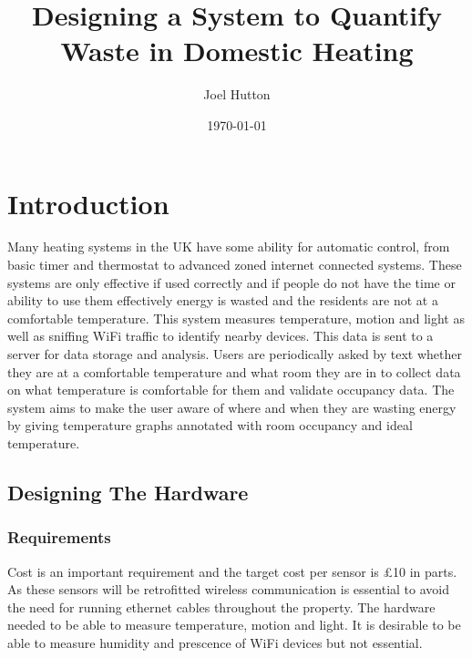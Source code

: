 \documentclass[bsc,frontabs,twoside,singlespacing,parskip,deptreport]{infthesis}
\begin{document}
\title{Designing a System to Quantify Waste in Domestic Heating}

\author{Joel Hutton}


\date{\today}


\maketitle

\tableofcontents



\chapter{Introduction}

Many heating systems in the UK have some ability for automatic control, from basic timer and thermostat to advanced zoned internet connected systems. These systems are only effective if used correctly and if people do not have the time or ability to use them effectively energy is wasted and the residents are not at a comfortable temperature. This system measures temperature, motion and light as well as sniffing WiFi traffic to identify nearby devices. This data is sent to a server for data storage and analysis. Users are periodically asked by text whether they are at a comfortable temperature and what room they are in to collect data on what temperature is comfortable for them and validate occupancy data. The system aims to make the user aware of where and when they are wasting energy by giving temperature graphs annotated with room occupancy and ideal temperature.        

\section{Designing The Hardware}
\subsection{Requirements}
Cost is an important requirement and the target cost per sensor is £10 in parts. As these sensors will be retrofitted wireless communication is essential to avoid the need for running ethernet cables throughout the property. The hardware needed to be able to measure temperature, motion and light. It is desirable to be able to measure humidity and prescence of WiFi devices but not essential.
\end{document}
